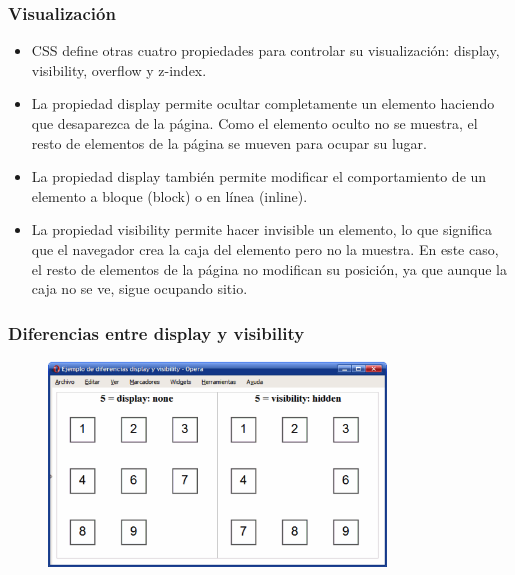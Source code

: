 \begin{frame}
\frametitle{Visualización}

\begin{itemize}
  \item CSS define otras cuatro propiedades para controlar su visualización: display, visibility, overflow y z-index.
  \item La propiedad display permite ocultar completamente un elemento haciendo que desaparezca de la página. Como el elemento oculto no se muestra, el resto de elementos de la página se mueven para ocupar su lugar.
  \item La propiedad display también permite modificar el comportamiento de un elemento a bloque (block) o en línea (inline).
  \item La propiedad visibility permite hacer invisible un elemento, lo que significa que el navegador crea la caja del elemento pero no la muestra. En este caso, el resto de elementos de la página no modifican su posición, ya que aunque la caja no se ve, sigue ocupando sitio.
\end{itemize}

\end{frame}



\begin{frame}
\frametitle{Diferencias entre display y visibility}

\begin{center}
\begin{figure}[p]
\includegraphics[width=0.8\textwidth]{figs/f0522.png}
\end{figure}
\end{center}

\end{frame}




